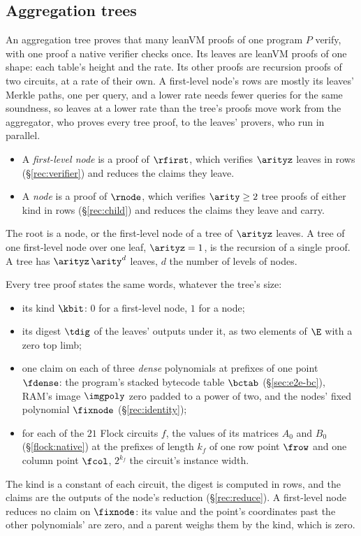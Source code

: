 \subsection{Aggregation trees}\label{rec:tree}

An aggregation tree proves that many leanVM proofs of one program $P$ verify, with one proof a native verifier checks once. Its leaves are leanVM proofs of one shape: each table's height and the rate. Its other proofs are recursion proofs of two circuits, at a rate of their own. A first-level node's rows are mostly its leaves' Merkle paths, one per query, and a lower rate needs fewer queries for the same soundness, so leaves at a lower rate than the tree's proofs move work from the aggregator, who proves every tree proof, to the leaves' provers, who run in parallel.
\begin{itemize}[itemsep=1pt,topsep=3pt]
\item A \emph{first-level node} is a proof of $\rfirst$, which verifies $\arityz$ leaves in rows (\S\ref{rec:verifier}) and reduces the claims they leave.
\item A \emph{node} is a proof of $\rnode$, which verifies $\arity\ge2$ tree proofs of either kind in rows (\S\ref{rec:child}) and reduces the claims they leave and carry.
\end{itemize}
The root is a node, or the first-level node of a tree of $\arityz$ leaves. A tree of one first-level node over one leaf, $\arityz=1$, is the recursion of a single proof. A tree has $\arityz\,\arity^d$ leaves, $d$ the number of levels of nodes.

Every tree proof states the same words, whatever the tree's size:
\begin{itemize}[itemsep=1pt,topsep=3pt]
\item its kind $\kbit$: $0$ for a first-level node, $1$ for a node;
\item its digest $\tdig$ of the leaves' outputs under it, as two elements of $\E$ with a zero top limb;
\item one claim on each of three \emph{dense} polynomials at prefixes of one point $\fdense$: the program's stacked bytecode table $\bctab$ (\S\ref{sec:e2e-bc}), RAM's image $\imgpoly$ zero padded to a power of two, and the nodes' fixed polynomial $\fixnode$ (\S\ref{rec:identity});
\item for each of the $21$ Flock circuits $f$, the values of its matrices $A_0$ and $B_0$ (\S\ref{flock:native}) at the prefixes of length $k_f$ of one row point $\frow$ and one column point $\fcol$, $2^{k_f}$ the circuit's instance width.
\end{itemize}
The kind is a constant of each circuit, the digest is computed in rows, and the claims are the outputs of the node's reduction (\S\ref{rec:reduce}). A first-level node reduces no claim on $\fixnode$: its value and the point's coordinates past the other polynomials' are zero, and a parent weighs them by the kind, which is zero.

